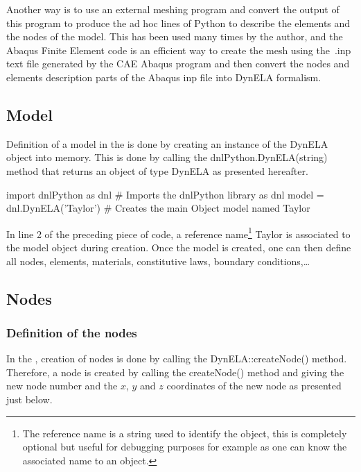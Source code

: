 Another way is to use an external meshing program and convert the output of this program to produce the ad hoc lines of Python to describe the elements and the nodes of the model. This has been used many times by the author, and the Abaqus Finite Element code is an efficient way to create the mesh using the \textsf{.inp} text file generated by the CAE Abaqus program and then convert the nodes and elements description parts of the Abaqus inp file into DynELA formalism.

\subsection{Model}

Definition of a model in the \DynELA is done by creating an instance of the \textsf{DynELA} object into memory. This is done by calling the \textsf{dnlPython.DynELA(string)} method that returns an object of type \textsf{DynELA} as presented hereafter.

\begin{PythonListing}
import dnlPython as dnl       # Imports the dnlPython library as dnl
model = dnl.DynELA('Taylor')  # Creates the main Object model named Taylor
\end{PythonListing}

In line 2 of the preceding piece of code, a reference name\footnote{The reference name is a string used to identify the object, this is completely optional but useful for debugging purposes for example as one can know the associated name to an object.} \textsf{Taylor} is associated to the \textsf{model} object during creation. Once the model is created, one can then define all nodes, elements, materials, constitutive laws, boundary conditions,\ldots

\subsection{Nodes}

\subsubsection{Definition of the nodes}

In the \DynELA, creation of nodes is done by calling the \textsf{DynELA::createNode()} method. Therefore, a node is created by calling the \textsf{createNode()} method and giving the new node number and the $x$, $y$ and $z$ coordinates of the new node as presented just below.

